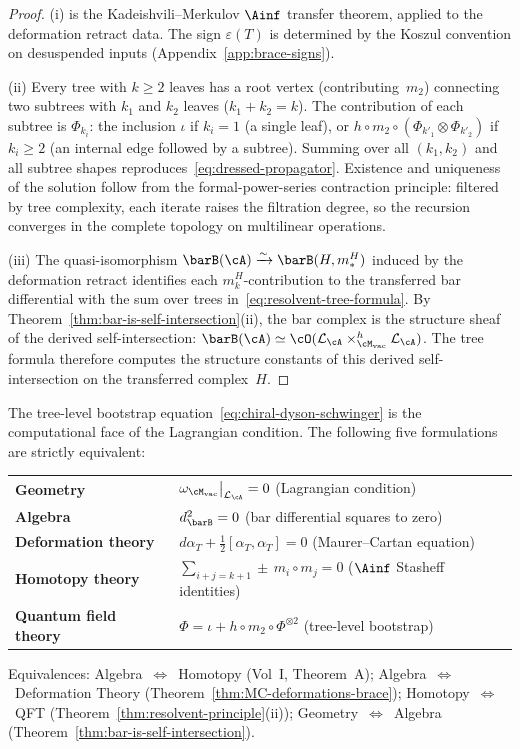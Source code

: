 \begin{proof}
(i) is the Kadeishvili--Merkulov $\Ainf$ transfer theorem, applied
to the deformation retract data. The sign $\varepsilon(T)$ is
determined by the Koszul convention on desuspended inputs
(Appendix~\ref{app:brace-signs}).

(ii) Every tree with $k \geq 2$ leaves has a root vertex
(contributing~$m_2$) connecting two subtrees with $k_1$ and $k_2$
leaves ($k_1 + k_2 = k$). The contribution of each subtree is
$\Phi_{k_i}$: the inclusion $\iota$ if $k_i = 1$ (a single leaf),
or $h \circ m_2 \circ (\Phi_{k'_1} \otimes \Phi_{k'_2})$ if
$k_i \geq 2$ (an internal edge followed by a subtree).
Summing over all $(k_1, k_2)$ and all subtree shapes
reproduces~\eqref{eq:dressed-propagator}. Existence and
uniqueness of the solution follow from the
formal-power-series contraction principle: filtered by tree
complexity, each iterate raises the filtration degree, so the
recursion converges in the complete topology on multilinear
operations.

(iii) The quasi-isomorphism
$\barB(\cA) \xrightarrow{\sim} \barB(H, m_\ast^H)$
induced by the deformation retract identifies each
$m_k^H$-contribution to the transferred bar differential with
the sum over trees in~\eqref{eq:resolvent-tree-formula}.
By Theorem~\ref{thm:bar-is-self-intersection}(ii),
the bar complex is the structure sheaf of the derived
self-intersection:
$\barB(\cA) \simeq \cO(\cL_\cA \times_{\Mvac}^h \cL_\cA)$.
The tree formula therefore computes the structure constants
of this derived self-intersection on the transferred
complex~$H$.
\end{proof}

\begin{remark}
\label{rem:five-names}
The tree-level bootstrap
equation~\eqref{eq:chiral-dyson-schwinger} is the computational
face of the Lagrangian condition. The following five formulations
are strictly equivalent:
\begin{center}
\renewcommand{\arraystretch}{1.3}
\begin{tabular}{@{}ll@{}}
\textbf{Geometry} &
 $\omega_{\Mvac}\big|_{\cL_\cA} = 0$
 \quad (Lagrangian condition) \\
\textbf{Algebra} &
 $d_{\barB}^2 = 0$
 \quad (bar differential squares to zero) \\
\textbf{Deformation theory} &
 $d\alpha_T + \tfrac{1}{2}[\alpha_T, \alpha_T] = 0$
 \quad (Maurer--Cartan equation) \\
\textbf{Homotopy theory} &
 $\sum_{i+j=k+1} \pm\, m_i \circ m_j = 0$
 \quad ($\Ainf$ Stasheff identities) \\
\textbf{Quantum field theory} &
 $\Phi = \iota + h \circ m_2 \circ \Phi^{\otimes 2}$
 \quad (tree-level bootstrap)
\end{tabular}
\end{center}
Equivalences:
Algebra~$\Leftrightarrow$~Homotopy (Vol~I, Theorem~A);
Algebra~$\Leftrightarrow$~Deformation Theory
(Theorem~\ref{thm:MC-deformations-brace});
Homotopy~$\Leftrightarrow$~QFT
(Theorem~\ref{thm:resolvent-principle}(ii));
Geometry~$\Leftrightarrow$~Algebra
(Theorem~\ref{thm:bar-is-self-intersection}).
\end{remark}

